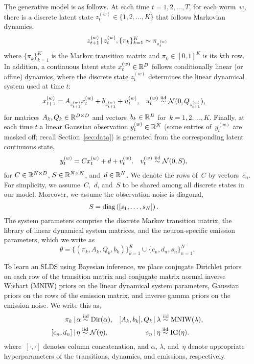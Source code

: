 \documentclass[11pt]{article}
\begin{document}
The generative model is as follows. At each time ${t=1,2,\ldots,T}$,
for each worm~$w$,
there is a discrete latent state ${z_t^{(w)} \in \{1,2, \ldots,K\}}$ that
follows Markovian dynamics,
\begin{equation}
  z_{t+1}^{(w)} \,|\, z_t^{(w)}, \{\pi_k\}_{k=1}^K  \sim \pi_{z_t^{(w)}}
  \label{eq:markov_z}
\end{equation}
where ${\{\pi_k\}_{k=1}^K}$ is the Markov transition matrix and
${\pi_k \in [0,1]^K}$ is its $k$th row. 
In addition, a continuous latent state ${x_t^{(w)} \in \mathbb{R}^D}$ follows
conditionally linear (or affine) dynamics, where the discrete state $z_t^{(w)}$
determines the linear dynamical system used at time $t$:
\begin{align}
  x_{t+1}^{(w)} &= A_{z_{t+1}^{(w)}} x_{t}^{(w)} + b_{z_{t+1}^{(w)}} +  u_t^{(w)},
  &
  u_t^{(w)} &\stackrel{\text{iid}}{\sim} \mathcal{N}(0,Q_{z_{t+1}^{(w)}}),
  \label{eq:slds_start}
\end{align}
for matrices ${A_k, Q_k \in \mathbb{R}^{D \times D}}$ and vectors~${b_k\in
\mathbb{R}^D}$ for~${k=1,2,\ldots,K}$.
Finally, at each time $t$ a linear Gaussian observation $y_t^{(w)} \in \mathbb{R}^N$
(some entries of~$y_t^{(w)}$ are masked off; recall Section~\ref{sec:data}) is
generated from the corresponding latent continuous state,
\begin{align}
  y_t^{(w)} &= C x_t^{(w)} + d + v_t^{(w)}, & v_t^{(w)} &\stackrel{\text{iid}}{\sim} \mathcal{N}(0,S),
    \label{eq:slds_end}
\end{align}
for $C \in \mathbb{R}^{N \times D}$, $S \in \mathbb{R}^{N \times N}$,
and~$d \in \mathbb{R}^N$. We denote the rows of~$C$ by vectors~$c_n$.
For simplicity, we assume~$C$,~$d$, and~$S$ to
be shared among all discrete states in our model.  Moreover, we assume
the observation noise is diagonal,
\begin{align*}
  S &= \textrm{diag}\left(\left[s_{1}, \ldots, s_{N} \right] \right). 
\end{align*}
The system parameters comprise the discrete Markov transition matrix, the
library of linear dynamical system matrices, and the neuron-specific
emission parameters, which we write as
\begin{equation*}
  \theta = \{(\pi_k, A_k, Q_k, b_k)\}_{k=1}^K \cup \{c_n, d_n, s_n\}_{n=1}^N.
\end{equation*}

To learn an SLDS using Bayesian inference, we place conjugate Dirichlet priors
on each row of the transition matrix and conjugate matrix normal
inverse Wishart (MNIW) priors on the linear dynamical system parameters,
Gaussian priors on the rows of the emission matrix,
and inverse gamma priors on the emission noise.
We write this as,
\begin{align*}
  \pi_k &\,|\, \alpha \stackrel{\text{iid}}{\sim} \mathrm{Dir}(\alpha),
  &
  [A_k, b_k], Q_k &\,|\, \lambda \stackrel{\text{iid}}{\sim} \mathrm{MNIW}(\lambda),
  \\
  [c_n, d_n] &\,|\, \eta \stackrel{\text{iid}}{\sim} \mathcal{N}(\eta),
  &
  s_{n} &\,|\, \eta \stackrel{\text{iid}}{\sim} \mathrm{IG}(\eta).
\end{align*}
where~$[\cdot, \cdot]$ denotes column concatenation, and $\alpha$, $\lambda$,
and~$\eta$ denote appropriate hyperparameters of the transitions, dynamics, and
emissions, respectively.
\end{document}

